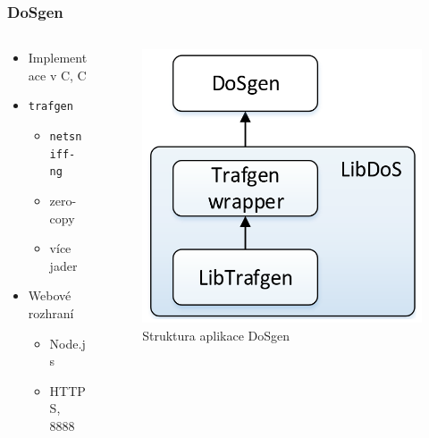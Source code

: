 \documentclass[%
12pt,       				%
t,                  %
aspectratio=1610,   %
unicode,						%
czech,              %
]{beamer}				    	%
\newcommand{\CC}{C\nolinebreak\hspace{-.05em}\raisebox{.4ex}{\tiny\bf +}\nolinebreak\hspace{-.10em}\raisebox{.4ex}{\tiny\bf +}}
\def\CC{{C\nolinebreak[4]\hspace{-.05em}\raisebox{.4ex}{\tiny\bf ++}}}
\begin{document}
\begin{frame}
\frametitle{DoSgen}
\begin{columns}[T] 								%
\begin{column}{0.4\textwidth}		%
\begin{itemize}
\item Implementace v C, \CC
\item \texttt{trafgen}
\begin{itemize}
	\item \texttt{netsniff-ng}
	\item zero-copy
	\item více jader
\end{itemize}
\item Webové rozhraní
\begin{itemize}
	\item Node.js
	\item HTTPS, 8888
\end{itemize}
\end{itemize}
\end{column}
%
\begin{column}{0.6\textwidth}		%
\begin{figure}
\centering
\vspace{0.3cm}	              %
\includegraphics[width=0.6\columnwidth]{obrazky/dosgen_halaska_diagrampng.png}
\caption{Struktura aplikace DoSgen}%
\end{figure}
\end{column}
\end{columns}
\end{frame}

\end{document}
